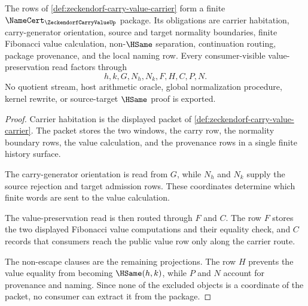 \begin{theorem}
\label{thm:zeckendorf-carry-value-namecert-package}
The rows of \autoref{def:zeckendorf-carry-value-carrier} form a finite $\NameCert_{\ZeckendorfCarryValueUp}$ package. Its obligations are carrier habitation, carry-generator orientation, source and target normality boundaries, finite Fibonacci value calculation, non-$\HSame$ separation, continuation routing, package provenance, and the local naming row. Every consumer-visible value-preservation read factors through
$$
h,k,G,N_h,N_k,F,H,C,P,N.
$$
No quotient stream, host arithmetic oracle, global normalization procedure, kernel rewrite, or source-target $\HSame$ proof is exported.
\end{theorem}
\begin{proof}
Carrier habitation is the displayed packet of \autoref{def:zeckendorf-carry-value-carrier}. The packet stores the two windows, the carry row, the normality boundary rows, the value calculation, and the provenance rows in a single finite history surface.

The carry-generator orientation is read from $G$, while $N_h$ and $N_k$ supply the source rejection and target admission rows. These coordinates determine which finite words are sent to the value calculation.

The value-preservation read is then routed through $F$ and $C$. The row $F$ stores the two displayed Fibonacci value computations and their equality check, and $C$ records that consumers reach the public value row only along the carrier route.

The non-escape clauses are the remaining projections. The row $H$ prevents the value equality from becoming $\HSame(h,k)$, while $P$ and $N$ account for provenance and naming. Since none of the excluded objects is a coordinate of the packet, no consumer can extract it from the package.
\end{proof}

